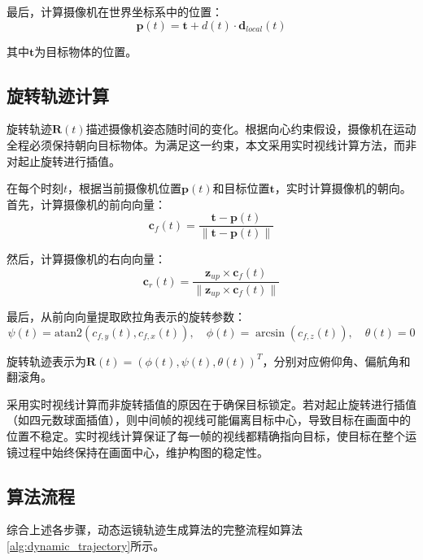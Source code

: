 最后，计算摄像机在世界坐标系中的位置：
\begin{equation}
\mathbf{p}(t) = \mathbf{t} + d(t) \cdot \mathbf{d}_{local}(t)
\label{eq:position_trajectory}
\end{equation}

其中$\mathbf{t}$为目标物体的位置。

\subsection{旋转轨迹计算}

旋转轨迹$\mathbf{R}(t)$描述摄像机姿态随时间的变化。根据向心约束假设，摄像机在运动全程必须保持朝向目标物体。为满足这一约束，本文采用实时视线计算方法，而非对起止旋转进行插值。

在每个时刻$t$，根据当前摄像机位置$\mathbf{p}(t)$和目标位置$\mathbf{t}$，实时计算摄像机的朝向\cite{shirley2009fundamentals}。首先，计算摄像机的前向向量：
\begin{equation}
\mathbf{c}_f(t) = \frac{\mathbf{t} - \mathbf{p}(t)}{\|\mathbf{t} - \mathbf{p}(t)\|}
\end{equation}

然后，计算摄像机的右向向量：
\begin{equation}
\mathbf{c}_r(t) = \frac{\mathbf{z}_{up} \times \mathbf{c}_f(t)}{\|\mathbf{z}_{up} \times \mathbf{c}_f(t)\|}
\end{equation}

最后，从前向向量提取欧拉角表示的旋转参数：
\begin{equation}
\psi(t) = \text{atan2}(c_{f,y}(t), c_{f,x}(t)), \quad
\phi(t) = \arcsin(c_{f,z}(t)), \quad
\theta(t) = 0
\end{equation}

旋转轨迹表示为$\mathbf{R}(t) = (\phi(t), \psi(t), \theta(t))^T$，分别对应俯仰角、偏航角和翻滚角。

采用实时视线计算而非旋转插值的原因在于确保目标锁定。若对起止旋转进行插值（如四元数球面插值\cite{shoemake1985animating}），则中间帧的视线可能偏离目标中心，导致目标在画面中的位置不稳定。实时视线计算保证了每一帧的视线都精确指向目标，使目标在整个运镜过程中始终保持在画面中心，维护构图的稳定性。

\subsection{算法流程}

综合上述各步骤，动态运镜轨迹生成算法的完整流程如算法\ref{alg:dynamic_trajectory}所示。

